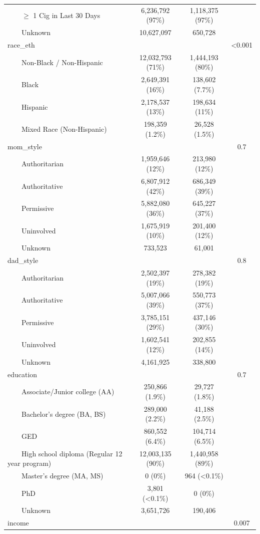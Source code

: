 \documentclass[
]{article}
\begin{document}
\begin{table}[t]
\begin{tabular*}{\linewidth}{@{\extracolsep{\fill}}lccc}
    \ensuremath{\geq} 1 Cig in Last 30 Days & 6,236,792 (97\%) & 1,118,375 (97\%) &  \\ 
    Unknown & 10,627,097 & 650,728 &  \\ 
race\_eth &  &  & <0.001 \\ 
    Non-Black / Non-Hispanic & 12,032,793 (71\%) & 1,444,193 (80\%) &  \\ 
    Black & 2,649,391 (16\%) & 138,602 (7.7\%) &  \\ 
    Hispanic & 2,178,537 (13\%) & 198,634 (11\%) &  \\ 
    Mixed Race (Non-Hispanic) & 198,359 (1.2\%) & 26,528 (1.5\%) &  \\ 
mom\_style &  &  & 0.7 \\ 
    Authoritarian & 1,959,646 (12\%) & 213,980 (12\%) &  \\ 
    Authoritative & 6,807,912 (42\%) & 686,349 (39\%) &  \\ 
    Permissive & 5,882,080 (36\%) & 645,227 (37\%) &  \\ 
    Uninvolved & 1,675,919 (10\%) & 201,400 (12\%) &  \\ 
    Unknown & 733,523 & 61,001 &  \\ 
dad\_style &  &  & 0.8 \\ 
    Authoritarian & 2,502,397 (19\%) & 278,382 (19\%) &  \\ 
    Authoritative & 5,007,066 (39\%) & 550,773 (37\%) &  \\ 
    Permissive & 3,785,151 (29\%) & 437,146 (30\%) &  \\ 
    Uninvolved & 1,602,541 (12\%) & 202,855 (14\%) &  \\ 
    Unknown & 4,161,925 & 338,800 &  \\ 
education &  &  & 0.7 \\ 
    Associate/Junior college (AA) & 250,866 (1.9\%) & 29,727 (1.8\%) &  \\ 
    Bachelor's degree (BA, BS) & 289,000 (2.2\%) & 41,188 (2.5\%) &  \\ 
    GED & 860,552 (6.4\%) & 104,714 (6.5\%) &  \\ 
    High school diploma (Regular 12 year program) & 12,003,135 (90\%) & 1,440,958 (89\%) &  \\ 
    Master's degree (MA, MS) & 0 (0\%) & 964 (<0.1\%) &  \\ 
    PhD & 3,801 (<0.1\%) & 0 (0\%) &  \\ 
    Unknown & 3,651,726 & 190,406 &  \\ 
income &  &  & 0.007 \\ 

\end{tabular*}
\end{table}
\end{document}
